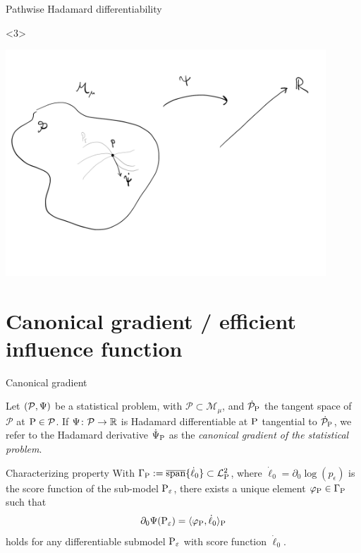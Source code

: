 \documentclass{beamer}\usepackage{listings}
\begin{document}
\begin{frame}[label={sec:org409d0ac}]{Pathwise Hadamard differentiability}
\begin{onlyenv}<3>
\begin{center}
\includegraphics[width=0.9\textwidth]{./figures/Pathwise-derivative2.pdf}
\end{center}
\end{onlyenv}
\end{frame}

\section{Canonical gradient / efficient influence function}
\label{sec:org8211d6d}
\begin{frame}[label={sec:orgac93147}]{Canonical gradient}
\begin{definition}
Let \((\mathcal{P}, \TT)\) be a statistical problem, with \(\mathcal{P} \subset \mathcal{M}_{\mu}\),
and \(\dot{\mathcal{P}}_{\P}\) the tangent space of \(\mathcal{P}\) at \(\P \in \mathcal{P}\). If
\(\TT \colon \mathcal{P} \rightarrow \R\) is Hadamard differentiable at \(\P\) tangential to
\(\dot{\mathcal{P}}_{\P}\), we refer to the Hadamard derivative \(\dot{\TT}_{\P}\) as the
\textit{canonical gradient of the statistical problem}.

\pause
\end{definition}

\begin{block}{Characterizing property}
With $\Gamma_{\P} := \overline{\mathrm{span}}\{\dot{\ell}_0\} \subset \lp$, where
$\dot{\ell}_0 = \partial_0{\log(p_{\epsilon})}$ is the score function of the sub-model
$\P_{\epsilon}$, there exists a unique element $\phi_{\P} \in \Gamma_{\P}$ such that
\begin{equation*}
  \partial_0{\TT(\P_{\epsilon})}
  = \langle \phi_{\P}, \dot{\ell}_0 \rangle_{\P}
\end{equation*}
holds for any differentiable submodel $\P_{\epsilon}$ with score function $\dot{\ell}_0$.
\end{block}
\end{frame}
\end{document}
